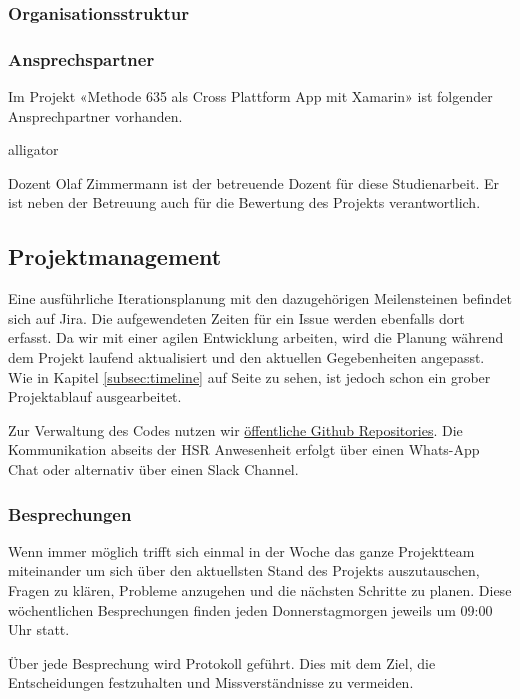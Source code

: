 \subsubsection*{Organisationsstruktur}

\subsubsection*{Ansprechspartner}
Im Projekt «Methode 635 als Cross Plattform App mit Xamarin» ist folgender Ansprechpartner vorhanden.

\begin{labeling}{alligator}
\item [Dozent] Olaf Zimmermann ist der betreuende Dozent für diese Studienarbeit. Er ist neben der Betreuung auch für die Bewertung des Projekts verantwortlich. 
\end{labeling}

\subsection{Projektmanagement}
Eine ausführliche Iterationsplanung mit den dazugehörigen Meilensteinen befindet sich auf Jira. Die aufgewendeten Zeiten für ein Issue werden ebenfalls dort erfasst. 
Da wir mit einer agilen Entwicklung arbeiten, wird die Planung während dem Projekt laufend aktualisiert und den aktuellen Gegebenheiten angepasst. 
Wie in Kapitel \ref{subsec:timeline} auf Seite \pageref{fig:projekt-plan} zu sehen, ist jedoch schon ein grober Projektablauf ausgearbeitet. 

Zur Verwaltung des Codes nutzen wir \href{https://github.com/BrainingOutOfBox/App}{öffentliche Github Repositories}. Die Kommunikation abseits der HSR Anwesenheit erfolgt über einen Whats-App Chat oder alternativ über einen Slack Channel.

\subsubsection*{Besprechungen}
Wenn immer möglich trifft sich einmal in der Woche das ganze Projektteam miteinander um sich über den aktuellsten Stand des Projekts auszutauschen, Fragen zu klären, Probleme anzugehen und die nächsten Schritte zu planen. 
Diese wöchentlichen Besprechungen finden jeden Donnerstagmorgen jeweils um 09:00 Uhr statt.

Über jede Besprechung wird Protokoll geführt. Dies mit dem Ziel, die Entscheidungen festzuhalten und Missverständnisse zu vermeiden.

